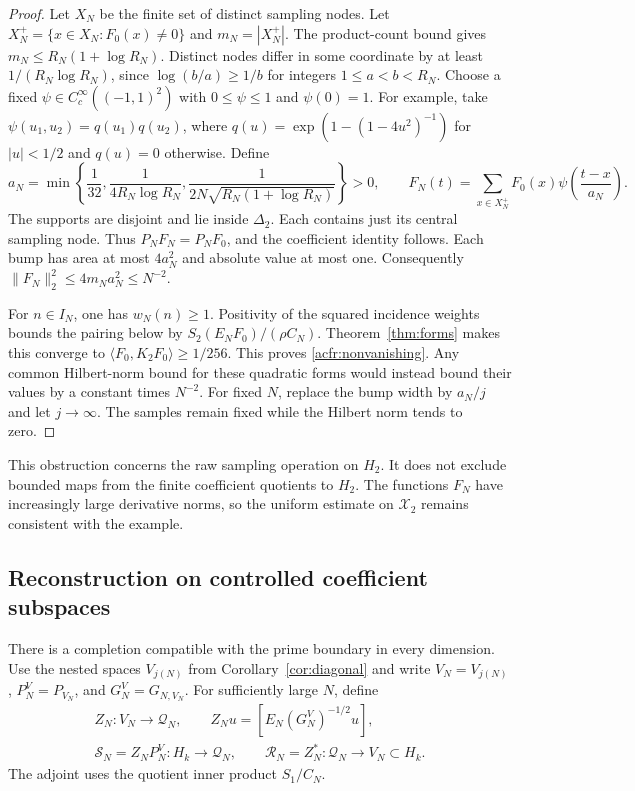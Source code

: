 \begin{proof}
Let $X_N$ be the finite set of distinct sampling nodes.
Let $X_N^+=\{x\in X_N:F_0(x)\ne0\}$ and $m_N=|X_N^+|$.
The product-count bound gives $m_N\leq R_N(1+\log R_N)$.
Distinct nodes differ in some coordinate by at least
$1/(R_N\log R_N)$, since $\log(b/a)\geq1/b$ for integers $1\leq a<b<R_N$.
Choose a fixed $\psi\in C_c^\infty((-1,1)^2)$ with
$0\leq\psi\leq1$ and $\psi(0)=1$.
For example, take $\psi(u_1,u_2)=q(u_1)q(u_2)$, where
$q(u)=\exp(1-(1-4u^2)^{-1})$ for $|u|<1/2$ and $q(u)=0$ otherwise.
Define
\[
 a_N=\min\left\{\frac1{32},\frac1{4R_N\log R_N},
              \frac1{2N\sqrt{R_N(1+\log R_N)}}\right\}>0,\qquad
 F_N(t)=\sum_{x\in X_N^+}F_0(x)\psi\left(\frac{t-x}{a_N}\right).
\]
The supports are disjoint and lie inside $\Delta_2$.
Each contains just its central sampling node.
Thus $P_NF_N=P_NF_0$, and the coefficient identity follows.
Each bump has area at most $4a_N^2$ and absolute value at most one.
Consequently $\|F_N\|_2^2\leq4m_Na_N^2\leq N^{-2}$.

For $n\in I_N$, one has $w_N(n)\geq1$.
Positivity of the squared incidence weights bounds the pairing below by
$S_2(E_NF_0)/(\rho C_N)$.
Theorem~\ref{thm:forms} makes this converge to
$\langle F_0,K_2F_0\rangle\geq1/256$.
This proves \eqref{acfr:nonvanishing}.
Any common Hilbert-norm bound for these quadratic forms would instead
bound their values by a constant times $N^{-2}$.
For fixed $N$, replace the bump width by $a_N/j$ and let $j\to\infty$.
The samples remain fixed while the Hilbert norm tends to zero.
\end{proof}

This obstruction concerns the raw sampling operation on $H_2$.
It does not exclude bounded maps from the finite coefficient quotients to $H_2$.
The functions $F_N$ have increasingly large derivative norms, so the
uniform estimate on $\mathcal X_2$ remains consistent with the example.

\subsection{Reconstruction on controlled coefficient subspaces}

There is a completion compatible with the prime boundary in every dimension.
Use the nested spaces $V_{j(N)}$ from Corollary~\ref{cor:diagonal} and write
$V_N=V_{j(N)}$, $P_N^V=P_{V_N}$, and $G_N^V=G_{N,V_N}$.
For sufficiently large $N$, define
\begin{gather*}
 Z_N:V_N\to\mathcal Q_N,\qquad
 Z_Nu=[E_N(G_N^V)^{-1/2}u],\\
 \mathscr S_N=Z_NP_N^V:H_k\to\mathcal Q_N,\qquad
 \mathscr R_N=Z_N^*:\mathcal Q_N\to V_N\subset H_k.
\end{gather*}
The adjoint uses the quotient inner product $S_1/C_N$.

